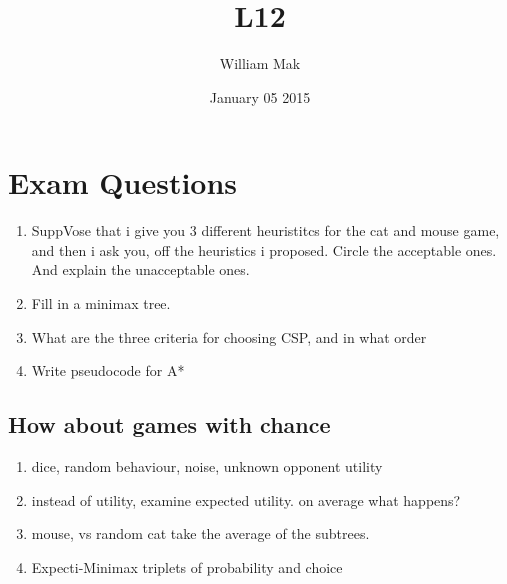 \documentclass{article}
\title{L12}
\author{William Mak}
\date{January 05 2015}
\begin{document}
\maketitle
\section{Exam Questions}
\begin{enumerate}
\item SuppVose that i give you 3 different heuristitcs for the cat and mouse game, and then i ask you, off the heuristics i proposed. Circle the acceptable ones. And explain the unacceptable ones.
\item Fill in a minimax tree.
\item What are the three criteria for choosing CSP, and in what order
\item Write pseudocode for A*
\end{enumerate}
\subsection{How about games with chance}
\begin{enumerate}
\item dice, random behaviour, noise, unknown opponent utility
\item instead of utility, examine expected utility.
  \subitem on average what happens?
\item mouse, vs random cat
  \subitem take the average of the subtrees.
\item Expecti-Minimax
  \subitem triplets of probability and choice
\end{enumerate}
\end{document}
